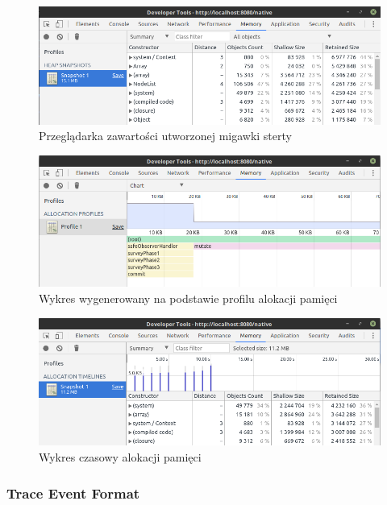 \documentclass[polish, twoside, 12pt]{mwart}
\begin{document}
\begin{figure}[ht]
  \includegraphics[width=\textwidth]{chrome-devtools-performance-heap-snapshot.png}
	\caption{Przeglądarka zawartości utworzonej migawki sterty}
\end{figure}

\begin{figure}[ht]
  \includegraphics[width=\textwidth]{chrome-devtools-performance-allocation-profile.png}
	\caption{Wykres wygenerowany na podstawie profilu alokacji pamięci}
\end{figure}

\begin{figure}[ht]
  \includegraphics[width=\textwidth]{chrome-devtools-performance-allocation-timeline.png}
	\caption{Wykres czasowy alokacji pamięci}
\end{figure}

\subsubsection{Trace Event Format} \label{trace-event-format-section}
\end{document}
